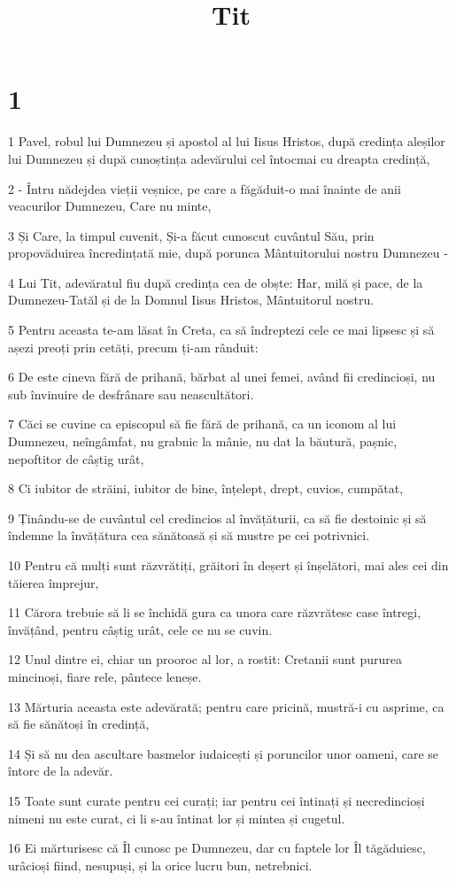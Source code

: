 

\title{Tit}


\chapter{1}

\par 1 Pavel, robul lui Dumnezeu și apostol al lui Iisus Hristos, după credința aleșilor lui Dumnezeu și după cunoștința adevărului cel întocmai cu dreapta credință,
\par 2 - Întru nădejdea vieții veșnice, pe care a făgăduit-o mai înainte de anii veacurilor Dumnezeu, Care nu minte,
\par 3 Și Care, la timpul cuvenit, Și-a făcut cunoscut cuvântul Său, prin propovăduirea încredințată mie, după porunca Mântuitorului nostru Dumnezeu -
\par 4 Lui Tit, adevăratul fiu după credința cea de obște: Har, milă și pace, de la Dumnezeu-Tatăl și de la Domnul Iisus Hristos, Mântuitorul nostru.
\par 5 Pentru aceasta te-am lăsat în Creta, ca să îndreptezi cele ce mai lipsesc și să așezi preoți prin cetăți, precum ți-am rânduit:
\par 6 De este cineva fără de prihană, bărbat al unei femei, având fii credincioși, nu sub învinuire de desfrânare sau neascultători.
\par 7 Căci se cuvine ca episcopul să fie fără de prihană, ca un iconom al lui Dumnezeu, neîngâmfat, nu grabnic la mânie, nu dat la băutură, pașnic, nepoftitor de câștig urât,
\par 8 Ci iubitor de străini, iubitor de bine, înțelept, drept, cuvios, cumpătat,
\par 9 Ținându-se de cuvântul cel credincios al învățăturii, ca să fie destoinic și să îndemne la învățătura cea sănătoasă și să mustre pe cei potrivnici.
\par 10 Pentru că mulți sunt răzvrătiți, grăitori în deșert și înșelători, mai ales cei din tăierea împrejur,
\par 11 Cărora trebuie să li se închidă gura ca unora care răzvrătesc case întregi, învățând, pentru câștig urât, cele ce nu se cuvin.
\par 12 Unul dintre ei, chiar un prooroc al lor, a rostit: Cretanii sunt pururea mincinoși, fiare rele, pântece leneșe.
\par 13 Mărturia aceasta este adevărată; pentru care pricină, mustră-i cu asprime, ca să fie sănătoși în credință,
\par 14 Și să nu dea ascultare basmelor iudaicești și poruncilor unor oameni, care se întorc de la adevăr.
\par 15 Toate sunt curate pentru cei curați; iar pentru cei întinați și necredincioși nimeni nu este curat, ci li s-au întinat lor și mintea și cugetul.
\par 16 Ei mărturisesc că Îl cunosc pe Dumnezeu, dar cu faptele lor Îl tăgăduiesc, urâcioși fiind, nesupuși, și la orice lucru bun, netrebnici.

